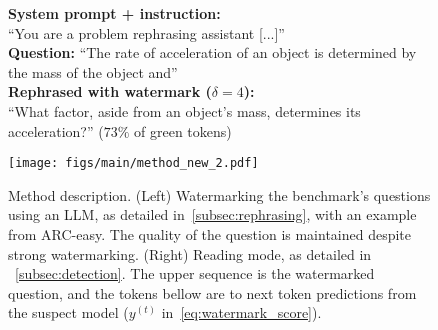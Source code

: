 \begin{figure}[b!]
    \vspace{-0.2cm}
    \centering
    \begin{minipage}{0.48\textwidth} %
        \begin{tcolorbox}[
            colframe=metablue, 
            colback=white, 
            width=\textwidth,
            left=2mm, right=2mm, top=2mm, bottom=2mm
        ] %
            {\footnotesize
            \textbf{System prompt + instruction:} \\``You are a problem rephrasing assistant [...]''
            \\[4pt]
            \textbf{Question:} ``The rate of acceleration of an object is determined by the mass of the object and''
            \\[4pt]
            \textbf{Rephrased with watermark ($\delta=4$):}\\
            ``What factor, aside from an object's mass, determines its acceleration?'' ($73\%$ of green tokens)
            }
        \end{tcolorbox}
        \label{fig:example_answers_main}
    \end{minipage}
    \hspace{0.02\textwidth} %
    \begin{minipage}{0.48\textwidth} %
        \centering
        \texttt{[image: figs/main/method\_new\_2.pdf]} 
        \label{fig:method_overview}
    \end{minipage}
    \caption{Method description. (Left) Watermarking the benchmark's questions using an LLM, as detailed in~\autoref{subsec:rephrasing}, with an example from ARC-easy. 
    The quality of the question is maintained despite strong watermarking. (Right) Reading mode, as detailed in ~\autoref{subsec:detection}.
    The upper sequence is the watermarked question, and the tokens bellow are to next token predictions from the suspect model ($y^{(t)}$ in~\autoref{eq:watermark_score}).}
    \vspace{-0.5cm}
    \label{fig:method_main}
\end{figure}

